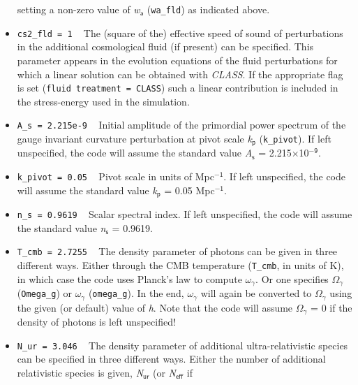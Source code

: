 \documentclass[a4paper,10pt]{article}
\begin{document}
\begin{itemize}
 setting a non-zero value of \textit{w}$_\mathsf{a}$ (\texttt{wa\_fld}) as indicated above.
 \item[] \hspace{-25pt}\texttt{cs2\_fld = 1} ~ The (square of the) effective speed of sound of perturbations in the additional cosmological fluid (if present)
 can be specified. This parameter appears in the evolution equations of the fluid perturbations for which a linear solution can be obtained with \textit{CLASS}.
 If the appropriate flag is set (\texttt{fluid treatment = CLASS}) such a linear contribution is included in the stress-energy used in the simulation.
 \item[] \hspace{-25pt}\texttt{A\_s = 2.215e-9} ~ Initial amplitude of the primordial power spectrum of the gauge invariant curvature
 perturbation at pivot scale \textit{k}$_\mathsf{p}$ (\texttt{k\_pivot}). If left unspecified, the code will assume the standard value
 \textit{A}$_\mathsf{s}$ = 2.215$\times$10$^\mathsf{-9}$.
 \item[] \hspace{-25pt}\texttt{k\_pivot = 0.05} ~  Pivot scale in units of Mpc${}^\mathsf{-1}$. If left unspecified, the code will assume
 the standard value \textit{k}$_\mathsf{p}$ = 0.05 Mpc${}^\mathsf{-1}$.
 \item[] \hspace{-25pt}\texttt{n\_s = 0.9619} ~ Scalar spectral index. If left unspecified, the code will assume the standard value
 \textit{n}$_\mathsf{s}$ = 0.9619.
 \item[] \hspace{-25pt}\texttt{T\_cmb = 2.7255} ~ The density parameter of photons can be given in three different ways. Either through the
 CMB temperature (\texttt{T\_cmb}, in units of K), in which case the code uses Planck's law to compute $\mathsf{\omega}_\mathsf{\gamma}$. Or
 one specifies $\mathsf{\Omega}_\mathsf{\gamma}$ (\texttt{Omega\_g}) or $\mathsf{\omega}_\mathsf{\gamma}$ (\texttt{omega\_g}). In the end,
 $\mathsf{\omega}_\mathsf{\gamma}$ will again be converted to $\mathsf{\Omega}_\mathsf{\gamma}$ using the given (or default) value of
 \textit{h}. Note that the code will assume $\mathsf{\Omega}_\mathsf{\gamma}$ = 0 if the density of photons is left unspecified!
 \item[] \hspace{-25pt}\texttt{N\_ur = 3.046} ~ The density parameter of additional ultra-relativistic species can be specified in three
 different ways. Either the number of additional relativistic species is given, \textit{N}$_\mathsf{ur}$ (or \textit{N}$_\mathsf{eff}$ if

\end{itemize}
\end{document}
